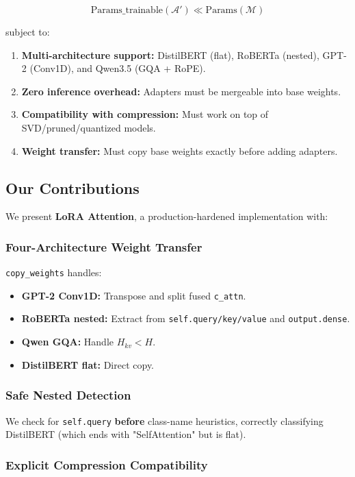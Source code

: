 \[
\text{Params}\_\text{trainable}(\mathcal{A}') \ll \text{Params}(\mathcal{M})
\tag{1.2}
\]

subject to:

\begin{enumerate}
\item \textbf{Multi-architecture support:} DistilBERT (flat), RoBERTa (nested),
  GPT-2 (Conv1D), and Qwen3.5 (GQA + RoPE).
\item \textbf{Zero inference overhead:} Adapters must be mergeable into base weights.
\item \textbf{Compatibility with compression:} Must work on top of SVD/pruned/quantized
  models.
\item \textbf{Weight transfer:} Must copy base weights exactly before adding adapters.

\end{enumerate}
\subsection{Our Contributions}

We present \textbf{LoRA Attention}, a production-hardened implementation with:

\subsubsection{Four-Architecture Weight Transfer}

\texttt{copy\_weights} handles:
\begin{itemize}
\item \textbf{GPT-2 Conv1D:} Transpose and split fused \texttt{c\_attn}.
\item \textbf{RoBERTa nested:} Extract from \texttt{self.query/key/value} and \texttt{output.dense}.
\item \textbf{Qwen GQA:} Handle $H_{kv} < H$.
\item \textbf{DistilBERT flat:} Direct copy.

\end{itemize}
\subsubsection{Safe Nested Detection}

We check for \texttt{self.query} \textbf{before} class-name heuristics, correctly 
classifying DistilBERT (which ends with "SelfAttention" but is flat).

\subsubsection{Explicit Compression Compatibility}


